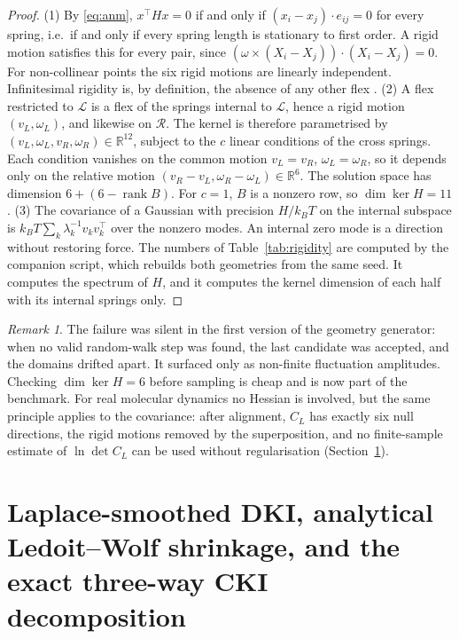 \documentclass[11pt,reqno]{amsart}
\theoremstyle{plain}
\theoremstyle{definition}
\theoremstyle{remark}
\newtheorem{remark}[theorem]{Remark}
\numberwithin{equation}{section}
\begin{document}
\begin{proof}
(1) By \eqref{eq:anm}, $x^{\top}Hx=0$ if and only if $(x_i-x_j)\cdot e_{ij}=0$ for every spring, i.e.\ if and only if every spring length is stationary to first order. A rigid motion satisfies this for every pair, since $(\omega\times(X_i-X_j))\cdot(X_i-X_j)=0$. For non-collinear points the six rigid motions are linearly independent. Infinitesimal rigidity is, by definition, the absence of any other flex \cite{AsimowRoth1978}.
(2) A flex restricted to $\mathcal L$ is a flex of the springs internal to $\mathcal L$, hence a rigid motion $(v_L,\omega_L)$, and likewise on $\mathcal R$. The kernel is therefore parametrised by $(v_L,\omega_L,v_R,\omega_R)\in\mathbb R^{12}$, subject to the $c$ linear conditions of the cross springs. Each condition vanishes on the common motion $v_L=v_R$, $\omega_L=\omega_R$, so it depends only on the relative motion $(v_R-v_L,\omega_R-\omega_L)\in\mathbb R^6$. The solution space has dimension $6+(6-\operatorname{rank}B)$. For $c=1$, $B$ is a nonzero row, so $\dim\ker H=11$.
(3) The covariance of a Gaussian with precision $H/k_BT$ on the internal subspace is $k_BT\sum_k\lambda_k^{-1}v_kv_k^{\top}$ over the nonzero modes. An internal zero mode is a direction without restoring force.
The numbers of Table~\ref{tab:rigidity} are computed by the companion script, which rebuilds both geometries from the same seed. It computes the spectrum of $H$, and it computes the kernel dimension of each half with its internal springs only.
\end{proof}

\begin{remark}
The failure was silent in the first version of the geometry generator: when no valid random-walk step was found, the last candidate was accepted, and the domains drifted apart. It surfaced only as non-finite fluctuation amplitudes. Checking $\dim\ker H=6$ before sampling is cheap and is now part of the benchmark. For real molecular dynamics no Hessian is involved, but the same principle applies to the covariance: after alignment, $C_L$ has exactly six null directions, the rigid motions removed by the superposition, and no finite-sample estimate of $\ln\det C_L$ can be used without regularisation (Section~\ref{sec:estimators}).
\end{remark}

\section{Laplace-smoothed DKI, analytical Ledoit--Wolf shrinkage, and the exact three-way CKI decomposition}
\label{sec:estimators}
\end{document}
